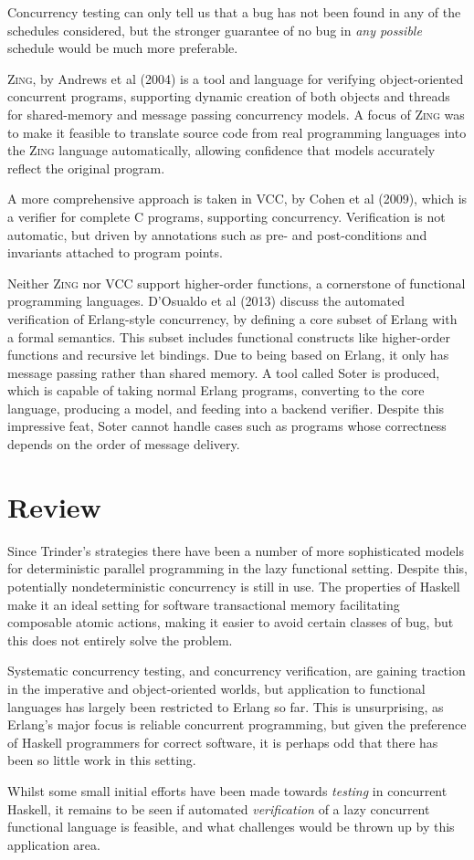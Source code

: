 Concurrency testing can only tell us that a bug has not been found in
any of the schedules considered, but the stronger guarantee of no bug
in \textit{any possible} schedule would be much more preferable.

\textsc{Zing}, by Andrews et al (2004)\nocite{zing} is a tool and
language for verifying object-oriented concurrent programs, supporting
dynamic creation of both objects and threads for shared-memory and
message passing concurrency models. A focus of \textsc{Zing} was to
make it feasible to translate source code from real programming
languages into the \textsc{Zing} language automatically, allowing
confidence that models accurately reflect the original program.

A more comprehensive approach is taken in VCC, by Cohen et al
(2009)\nocite{vcc}, which is a verifier for complete C programs,
supporting concurrency. Verification is not automatic, but driven by
annotations such as pre- and post-conditions and invariants attached
to program points.

Neither \textsc{Zing} nor VCC support higher-order functions, a
cornerstone of functional programming languages. D'Osualdo et al
(2013)\nocite{erlang} discuss the automated verification of
Erlang-style concurrency, by defining a core subset of Erlang with a
formal semantics. This subset includes functional constructs like
higher-order functions and recursive let bindings. Due to being based
on Erlang, it only has message passing rather than shared memory. A
tool called Soter is produced, which is capable of taking normal
Erlang programs, converting to the core language, producing a model,
and feeding into a backend verifier. Despite this impressive feat,
Soter cannot handle cases such as programs whose correctness depends
on the order of message delivery.

\section{Review}
\label{sec:litrev-review}

Since Trinder's strategies there have been a number of more
sophisticated models for deterministic parallel programming in the
lazy functional setting. Despite this, potentially nondeterministic
concurrency is still in use. The properties of Haskell make it an
ideal setting for software transactional memory facilitating
composable atomic actions, making it easier to avoid certain classes
of bug, but this does not entirely solve the problem.

Systematic concurrency testing, and concurrency verification, are
gaining traction in the imperative and object-oriented worlds, but
application to functional languages has largely been restricted to
Erlang so far. This is unsurprising, as Erlang's major focus is
reliable concurrent programming, but given the preference of Haskell
programmers for correct software, it is perhaps odd that there has
been so little work in this setting.

Whilst some small initial efforts have been made towards
\textit{testing} in concurrent Haskell, it remains to be seen if
automated \textit{verification} of a lazy concurrent functional
language is feasible, and what challenges would be thrown up by this
application area.
